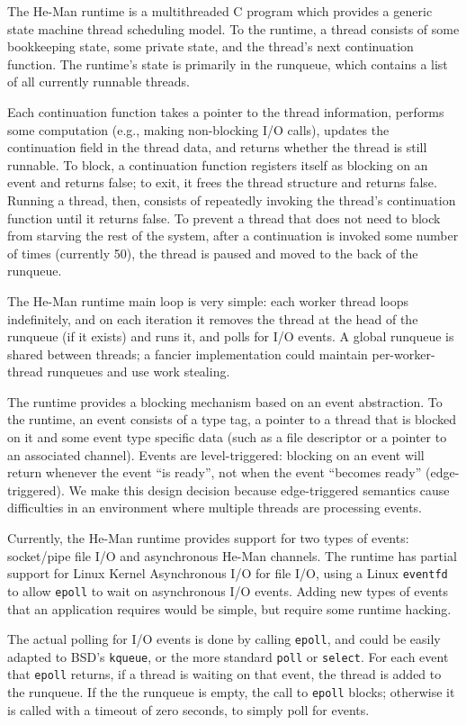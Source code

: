 \documentclass[preprint]{sigplanconf}
\renewcommand{\t}{\texttt}
\begin{document}
The He-Man runtime is a multithreaded C program which provides a generic state
machine thread scheduling model. To the runtime, a thread consists of some
bookkeeping state, some private state, and the thread's next continuation
function. The runtime's state is primarily in the runqueue, which contains a
list of all currently runnable threads.

Each continuation function takes a pointer to the thread information,
performs some computation (e.g., making non-blocking I/O calls),
updates the continuation field in the thread data, and returns whether
the thread is still runnable. To block, a continuation function
registers itself as blocking on an event and returns false; to exit,
it frees the thread structure and returns false. Running a thread,
then, consists of repeatedly invoking the thread's continuation
function until it returns false. To prevent a thread that does not
need to block from starving the rest of the system, after a continuation is
invoked some number of times (currently 50), the thread is paused and moved to
the back of the runqueue.

The He-Man runtime main loop is very simple: each worker thread
loops indefinitely, and on each iteration it removes the thread at the
head of the runqueue (if it exists) and runs it, and polls for I/O
events. A global runqueue is shared between threads; a fancier 
implementation could maintain per-worker-thread runqueues and use
work stealing.

The runtime provides a blocking mechanism based on an event
abstraction. To the runtime, an event consists of a type tag, a
pointer to a thread that is blocked on it and some event type specific
data (such as a file descriptor or a pointer to an associated
channel). Events are level-triggered: blocking on an event will return
whenever the event ``is ready'', not when the event ``becomes ready''
(edge-triggered). We make this design decision because edge-triggered semantics
cause difficulties in an environment where multiple threads are processing
events.

Currently, the He-Man runtime provides support for two types of
events: socket/pipe file I/O and asynchronous He-Man channels.  The
runtime has partial support for Linux Kernel Asynchronous I/O for file
I/O, using a Linux \t{eventfd} to allow \t{epoll} to wait on asynchronous I/O
events. Adding new types of events that an application requires would
be simple, but require some runtime hacking.

The actual polling for I/O events is done by calling \t{epoll}, and could be
easily adapted to BSD's \t{kqueue}, or the more standard \t{poll} or \t{select}.
For each event that \t{epoll} returns, if a thread is waiting on that event, the
thread is added to the runqueue. If the the runqueue is empty, the call to
\t{epoll} blocks; otherwise it is called with a timeout of zero seconds, to
simply poll for events.
\end{document}
